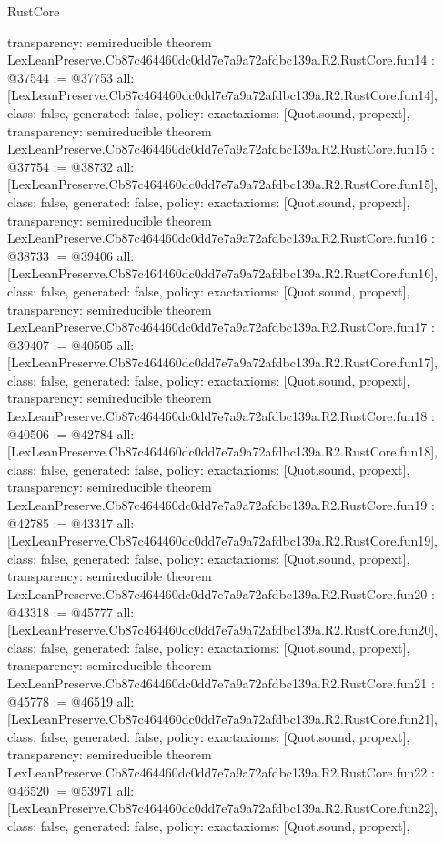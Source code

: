 \begin{lexlean}{RustCore}
\begin{coremodule}
{  transparency: semireducible
}
theorem LexLeanPreserve.Cb87c464460dc0dd7e7a9a72afdbc139a.R2.RustCore.fun14 : @37544 := @37753 {
  all: [LexLeanPreserve.Cb87c464460dc0dd7e7a9a72afdbc139a.R2.RustCore.fun14],
  class: false,
  generated: false,
  policy: exact{axioms: [Quot.sound, propext]},
  transparency: semireducible
}
theorem LexLeanPreserve.Cb87c464460dc0dd7e7a9a72afdbc139a.R2.RustCore.fun15 : @37754 := @38732 {
  all: [LexLeanPreserve.Cb87c464460dc0dd7e7a9a72afdbc139a.R2.RustCore.fun15],
  class: false,
  generated: false,
  policy: exact{axioms: [Quot.sound, propext]},
  transparency: semireducible
}
theorem LexLeanPreserve.Cb87c464460dc0dd7e7a9a72afdbc139a.R2.RustCore.fun16 : @38733 := @39406 {
  all: [LexLeanPreserve.Cb87c464460dc0dd7e7a9a72afdbc139a.R2.RustCore.fun16],
  class: false,
  generated: false,
  policy: exact{axioms: [Quot.sound, propext]},
  transparency: semireducible
}
theorem LexLeanPreserve.Cb87c464460dc0dd7e7a9a72afdbc139a.R2.RustCore.fun17 : @39407 := @40505 {
  all: [LexLeanPreserve.Cb87c464460dc0dd7e7a9a72afdbc139a.R2.RustCore.fun17],
  class: false,
  generated: false,
  policy: exact{axioms: [Quot.sound, propext]},
  transparency: semireducible
}
theorem LexLeanPreserve.Cb87c464460dc0dd7e7a9a72afdbc139a.R2.RustCore.fun18 : @40506 := @42784 {
  all: [LexLeanPreserve.Cb87c464460dc0dd7e7a9a72afdbc139a.R2.RustCore.fun18],
  class: false,
  generated: false,
  policy: exact{axioms: [Quot.sound, propext]},
  transparency: semireducible
}
theorem LexLeanPreserve.Cb87c464460dc0dd7e7a9a72afdbc139a.R2.RustCore.fun19 : @42785 := @43317 {
  all: [LexLeanPreserve.Cb87c464460dc0dd7e7a9a72afdbc139a.R2.RustCore.fun19],
  class: false,
  generated: false,
  policy: exact{axioms: [Quot.sound, propext]},
  transparency: semireducible
}
theorem LexLeanPreserve.Cb87c464460dc0dd7e7a9a72afdbc139a.R2.RustCore.fun20 : @43318 := @45777 {
  all: [LexLeanPreserve.Cb87c464460dc0dd7e7a9a72afdbc139a.R2.RustCore.fun20],
  class: false,
  generated: false,
  policy: exact{axioms: [Quot.sound, propext]},
  transparency: semireducible
}
theorem LexLeanPreserve.Cb87c464460dc0dd7e7a9a72afdbc139a.R2.RustCore.fun21 : @45778 := @46519 {
  all: [LexLeanPreserve.Cb87c464460dc0dd7e7a9a72afdbc139a.R2.RustCore.fun21],
  class: false,
  generated: false,
  policy: exact{axioms: [Quot.sound, propext]},
  transparency: semireducible
}
theorem LexLeanPreserve.Cb87c464460dc0dd7e7a9a72afdbc139a.R2.RustCore.fun22 : @46520 := @53971 {
  all: [LexLeanPreserve.Cb87c464460dc0dd7e7a9a72afdbc139a.R2.RustCore.fun22],
  class: false,
  generated: false,
  policy: exact{axioms: [Quot.sound, propext]},
}
\end{coremodule}
\end{lexlean}
